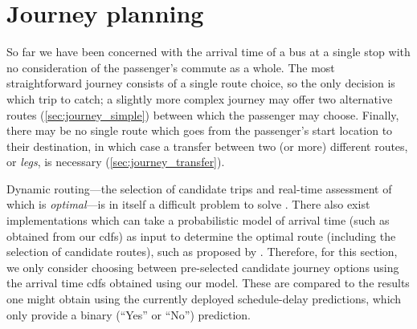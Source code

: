 \section{Journey planning}
\label{sec:etas-journey-planning}



So far we have been concerned with the arrival time of a bus at a single stop with no consideration of the passenger's commute as a whole. The most straightforward journey consists of a single route choice, so the only decision is which trip to catch; a slightly more complex journey may offer two alternative routes (\cref{sec:journey_simple}) between which the passenger may choose. Finally, there may be no single route which goes from the passenger's start location to their destination, in which case a transfer between two (or more) different routes, or \emph{legs}, is necessary (\cref{sec:journey_transfer}).


Dynamic routing---the selection of candidate trips and real-time assessment of which is \emph{optimal}---is in itself a difficult problem to solve \citep{Hame_2013a,Hame_2013b,Zheng_2016}. There also exist implementations which can take a probabilistic model of arrival time (such as obtained from our \glspl{cdf}) as input to determine the optimal route (including the selection of candidate routes), such as proposed by \citet{Berczi_2017}. Therefore, for this section, we only consider choosing between pre-selected candidate journey options using the arrival time \glspl{cdf} obtained using our \pf{} model. These are compared to the results one might obtain using the currently deployed schedule-delay predictions, which only provide a binary (``Yes'' or ``No'') prediction.


